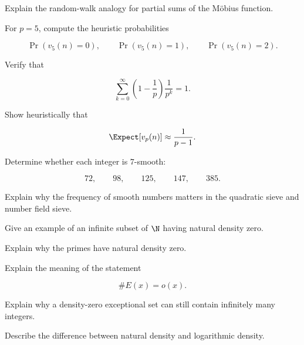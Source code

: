 \begin{exercise}[3]
Explain the random-walk analogy for partial sums of the Möbius function.
\end{exercise}

\begin{exercise}[2]
For \(p=5\), compute the heuristic probabilities

\[ \Pr(v_5(n)=0),\qquad\Pr(v_5(n)=1),\qquad\Pr(v_5(n)=2). \]
\end{exercise}

\begin{exercise}[2]
Verify that

\[
\sum_{k=0}^{\infty}
\left(1-\frac1p\right)\frac1{p^k}
=1.
\]
\end{exercise}

\begin{exercise}[2]
Show heuristically that

\[ \Expect[v_p(n)]\approx\frac1{p-1}. \]
\end{exercise}

\begin{exercise}[1]
Determine whether each integer is \(7\)-smooth:

\[ 72,\qquad98,\qquad125,\qquad147,\qquad385. \]
\end{exercise}

\begin{exercise}[2]
Explain why the frequency of smooth numbers matters in the quadratic sieve
and number field sieve.
\end{exercise}

\begin{exercise}[2]
Give an example of an infinite subset of \(\N\) having natural density zero.
\end{exercise}

\begin{exercise}[2]
Explain why the primes have natural density zero.
\end{exercise}

\begin{exercise}[2]
Explain the meaning of the statement

\[ \#E(x)=o(x). \]
\end{exercise}

\begin{exercise}[2]
Explain why a density-zero exceptional set can still contain infinitely many
integers.
\end{exercise}

\begin{exercise}[2]
Describe the difference between natural density and logarithmic density.
\end{exercise}

